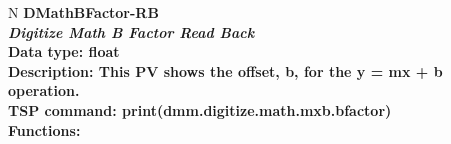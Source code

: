 \documentclass[openany]{article}
\begin{document}
		\begin{tabular}{N}
			\hline
			\bfseries DMathBFactor-RB\label{pv:dmathbfactor-rb} \\ \hline
			\emph{Digitize Math B Factor Read Back} \\
			Data type: float \\
			Description: This PV shows the offset, b, for the y = mx + b operation. \\
			TSP command: print(dmm.digitize.math.mxb.bfactor) \\
			Functions: \\
			\arrayrulecolor{\FuncTableBorderColor}

		\end{tabular}
\end{document}
